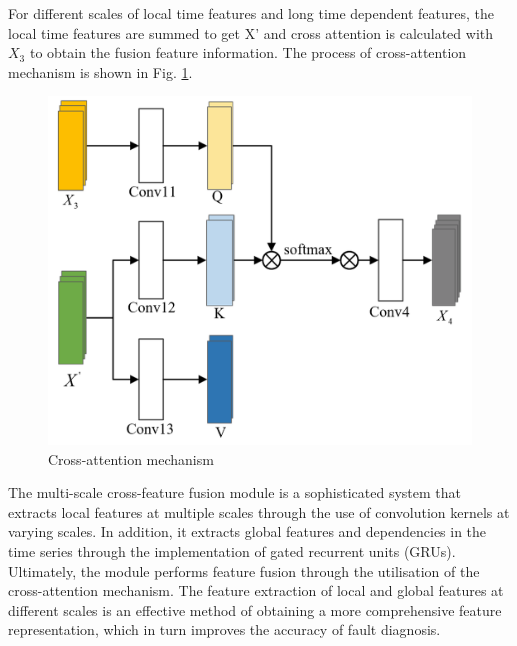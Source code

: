 \documentclass[journal,article,submit,pdftex,moreauthors]{Definitions/mdpi}
\begin{document}
For different scales of local time features and long time dependent features, the local time features are summed to get X' and cross attention is calculated with \({{X}_{3}}\) to obtain the fusion feature information. The process of cross-attention mechanism is shown in Fig. \ref{fig:Cross-attention mechanism}.

\begin{figure}[h]
    \centering
    \includegraphics[width=0.75\linewidth]{图片/交叉注意力机制.png}
    \caption{Cross-attention mechanism}
    \label{fig:Cross-attention mechanism}
\end{figure}
The multi-scale cross-feature fusion module is a sophisticated system that extracts local features at multiple scales through the use of convolution kernels at varying scales. In addition, it extracts global features and dependencies in the time series through the implementation of gated recurrent units (GRUs). Ultimately, the module performs feature fusion through the utilisation of the cross-attention mechanism. The feature extraction of local and global features at different scales is an effective method of obtaining a more comprehensive feature representation, which in turn improves the accuracy of fault diagnosis.
\end{document}
